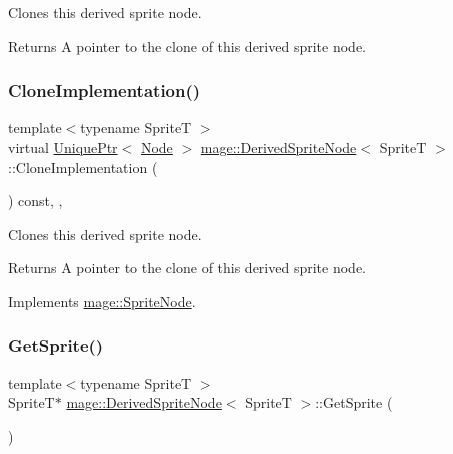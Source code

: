 Clones this derived sprite node.

\begin{DoxyReturn}{Returns}
A pointer to the clone of this derived sprite node. 
\end{DoxyReturn}
\hypertarget{classmage_1_1_derived_sprite_node_ae1aa2b80d4ff8688635df017826c11a5}{}\label{classmage_1_1_derived_sprite_node_ae1aa2b80d4ff8688635df017826c11a5} 
\subsubsection{\texorpdfstring{Clone\+Implementation()}{CloneImplementation()}}
{\footnotesize\ttfamily template$<$typename SpriteT $>$ \\
virtual \hyperlink{namespacemage_a3316d7143a973e37adf1110f2e80ca31}{Unique\+Ptr}$<$ \hyperlink{classmage_1_1_node}{Node} $>$ \hyperlink{classmage_1_1_derived_sprite_node}{mage\+::\+Derived\+Sprite\+Node}$<$ SpriteT $>$\+::Clone\+Implementation (\begin{DoxyParamCaption}{ }\end{DoxyParamCaption}) const\hspace{0.3cm}{\ttfamily [override]}, {\ttfamily [private]}, {\ttfamily [virtual]}}

Clones this derived sprite node.

\begin{DoxyReturn}{Returns}
A pointer to the clone of this derived sprite node. 
\end{DoxyReturn}


Implements \hyperlink{classmage_1_1_sprite_node_a83a2a865b38670d64491a1066895e218}{mage\+::\+Sprite\+Node}.

\hypertarget{classmage_1_1_derived_sprite_node_a4f380d16fcd3804d08d1f6f42ecc4780}{}\label{classmage_1_1_derived_sprite_node_a4f380d16fcd3804d08d1f6f42ecc4780} 
\subsubsection{\texorpdfstring{Get\+Sprite()}{GetSprite()}\hspace{0.1cm}{\footnotesize\ttfamily [1/2]}}
{\footnotesize\ttfamily template$<$typename SpriteT $>$ \\
SpriteT$\ast$ \hyperlink{classmage_1_1_derived_sprite_node}{mage\+::\+Derived\+Sprite\+Node}$<$ SpriteT $>$\+::Get\+Sprite (\begin{DoxyParamCaption}{ }\end{DoxyParamCaption})\hspace{0.3cm}{\ttfamily [noexcept]}}

